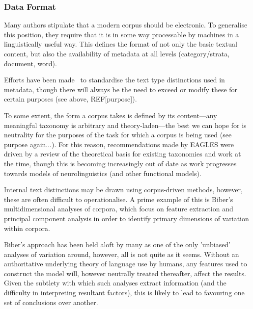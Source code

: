 

\subsubsection{Data Format}
Many authors stipulate that a modern corpus should be electronic.  To generalise this position, they require that it is in some way processable by machines in a linguistically useful way.  This defines the format of not only the basic textual content, but also the availability of metadata at all levels (category/strata, document, word).

Efforts have been made~\cite{EagTcwgCtypeaglespreliminary}\cite{ide1995tei}%
%
%
to standardise the text type distinctions used in metadata, though there will always be the need to exceed or modify these for certain purposes (see above, REF[purpose]).

To some extent, the form a corpus takes is defined by its content---any meaningful taxonomy is arbitrary and theory-laden---the best we can hope for is neutrality for the purposes of the task for which a corpus is being used (see purpose again...).  For this reason, recommendations made by EAGLES were driven by a review of the theoretical basis for existing taxonomies and work at the time, though this is becoming increasingly out of date as work progresses towards models of neurolinguistics (and other functional models).


Internal text distinctions may be drawn using corpus-driven methods, however, these are often difficult to operationalise.  A prime example of this is Biber's multidimensional analyses of corpora, which focus on feature extraction and principal component analysis in order to identify primary dimensions of variation within corpora.

Biber's approach has been held aloft by many as one of the only 'unbiased' analyses of variation around, however, all is not quite as it seems.  Without an authoritative underlying theory of language use by humans, any features used to construct the model will, however neutrally treated thereafter, affect the results.  Given the subtlety with which such analyses extract information (and the difficulty in interpreting resultant factors), this is likely to lead to favouring one set of conclusions over another.

